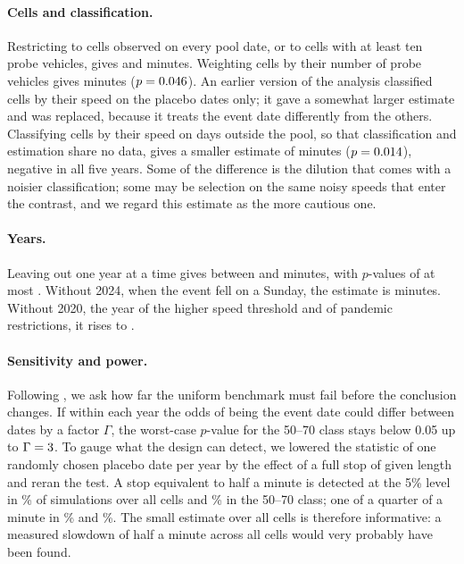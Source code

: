 \documentclass[11pt,a4paper]{article}
\begin{document}
\paragraph{Cells and classification.} Restricting to cells observed on every pool date, or to cells
with at least ten probe vehicles, gives \minRobBalanced{} and \minRobTen{} minutes. Weighting cells by their number of probe
vehicles gives \minRobWeighted{} minutes ($p = 0.046$). An earlier version of the analysis classified cells by their speed on the placebo dates only;
it gave a somewhat larger estimate and was replaced, because it treats the event date differently
from the others. Classifying cells by their speed on
days outside the pool, so that classification and estimation share no data, gives a smaller estimate
of \minRobOther{} minutes ($p = 0.014$), negative in all five years. Some of the difference is
the dilution that comes with a noisier classification; some may be selection on the same noisy speeds
that enter the contrast, and we regard this estimate as the more cautious one.

\paragraph{Years.} Leaving out one year at a time gives between \minLooLo{} and \minLooHi{} minutes,
with $p$-values of at most \pLooMax. Without 2024, when the event fell on a Sunday, the estimate is
\minRobWeekday{} minutes. Without 2020, the year of the higher speed threshold and of pandemic
restrictions, it rises to \minLooHi.

\paragraph{Sensitivity and power.} Following \citet{rosenbaum2002book}, we ask how far the uniform
benchmark must fail before the conclusion changes. If within each year the odds of being the event
date could differ between dates by a factor $\Gamma$, the worst-case $p$-value for the 50--70 class
stays below 0.05 up to $\Gamma = 3$. To gauge what the design can detect, we lowered the
statistic of one randomly chosen placebo date per year by the effect of a full stop of given length
and reran the test. A stop equivalent to half a minute is detected at the 5\% level in \powerAllHalf\%
of simulations over all cells and \powerFastHalf\% in the 50--70 class; one of a quarter of a minute in
\powerAllQuarter\% and \powerFastQuarter\%. The small estimate over all cells is therefore informative:
a measured slowdown of half a minute across all cells would very probably have been found.
\end{document}

